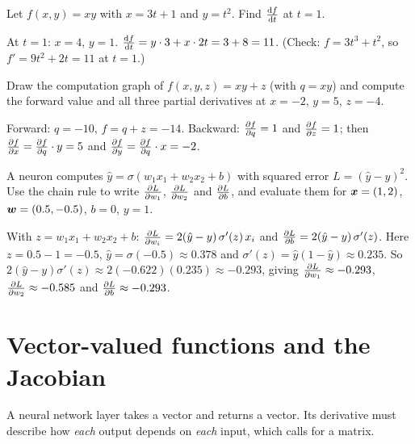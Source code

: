 \begin{exercise}
Let $f(x, y) = xy$ with $x = 3t + 1$ and $y = t^2$. Find $\frac{\mathrm{d} f}{\mathrm{d} t}$ at
$t = 1$.
\end{exercise}
\begin{solution}
At $t = 1$: $x = 4$, $y = 1$. $\frac{\mathrm{d} f}{\mathrm{d} t} = y\cdot3 + x\cdot2t = 3 + 8 = 11$.
(Check: $f = 3t^3 + t^2$, so $f' = 9t^2 + 2t = 11$ at $t = 1$.)
\end{solution}

\begin{exercise}
Draw the computation graph of $f(x, y, z) = xy + z$ (with $q = xy$) and compute
the forward value and all three partial derivatives at $x = -2$, $y = 5$,
$z = -4$.
\end{exercise}
\begin{solution}
Forward: $q = -10$, $f = q + z = -14$. Backward: $\frac{\partial f}{\partial q} = 1$ and
$\frac{\partial f}{\partial z} = 1$; then $\frac{\partial f}{\partial x} = \frac{\partial f}{\partial q}\cdot y = 5$ and
$\frac{\partial f}{\partial y} = \frac{\partial f}{\partial q}\cdot x = -2$.
\end{solution}

\begin{exercise}
A neuron computes $\hat y = \sigma(w_1x_1 + w_2x_2 + b)$ with squared error
$L = (\hat y - y)^2$. Use the chain rule to write $\frac{\partial L}{\partial w_1}$,
$\frac{\partial L}{\partial w_2}$ and $\frac{\partial L}{\partial b}$, and evaluate them for $\bm{x} = (1, 2)$,
$\bm{w} = (0.5, -0.5)$, $b = 0$, $y = 1$.
\end{exercise}
\begin{solution}
With $z = w_1x_1 + w_2x_2 + b$: $\frac{\partial L}{\partial w_i} = 2(\hat y - y)\,\sigma'(z)\,x_i$
and $\frac{\partial L}{\partial b} = 2(\hat y - y)\,\sigma'(z)$. Here $z = 0.5 - 1 = -0.5$,
$\hat y = \sigma(-0.5) \approx 0.378$ and $\sigma'(z) = \hat y(1 - \hat y)
\approx 0.235$. So $2(\hat y - y)\sigma'(z) \approx 2(-0.622)(0.235) \approx
-0.293$, giving $\frac{\partial L}{\partial w_1} \approx -0.293$, $\frac{\partial L}{\partial w_2} \approx
-0.585$ and $\frac{\partial L}{\partial b} \approx -0.293$.
\end{solution}

\section{Vector-valued functions and the Jacobian}\label{sec:jacobian}

A neural network layer takes a vector and returns a vector. Its derivative
must describe how \emph{each} output depends on \emph{each} input, which calls for
a matrix.

